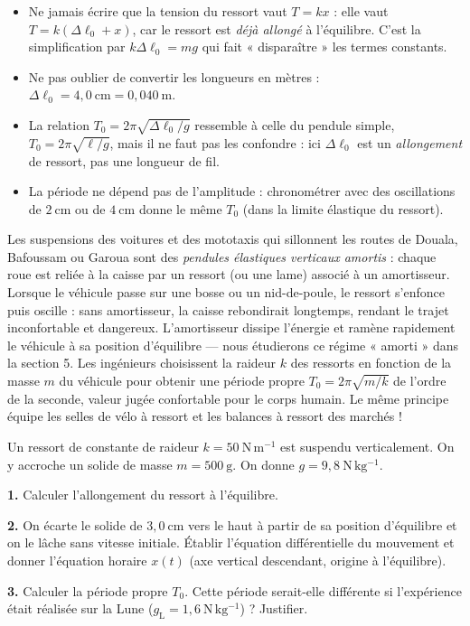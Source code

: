 \documentclass[11pt]{article}
\begin{document}
\begin{attention}
\begin{itemize}
\item Ne jamais écrire que la tension du ressort vaut $T = kx$ : elle vaut $T = k(\Delta\ell_0 + x)$, car le ressort est \emph{déjà allongé} à l'équilibre. C'est la simplification par $k\Delta\ell_0 = mg$ qui fait « disparaître » les termes constants.
\item Ne pas oublier de convertir les longueurs en mètres : $\Delta\ell_0 = 4{,}0~\mathrm{cm} = 0{,}040~\mathrm{m}$.
\item La relation $T_0 = 2\pi\sqrt{\Delta\ell_0/g}$ ressemble à celle du pendule simple, $T_0 = 2\pi\sqrt{\ell/g}$, mais il ne faut pas les confondre : ici $\Delta\ell_0$ est un \emph{allongement} de ressort, pas une longueur de fil.
\item La période ne dépend pas de l'amplitude : chronométrer avec des oscillations de $2~\mathrm{cm}$ ou de $4~\mathrm{cm}$ donne le même $T_0$ (dans la limite élastique du ressort).
\end{itemize}
\end{attention}

\begin{savaistu}
Les suspensions des voitures et des mototaxis qui sillonnent les routes de Douala, Bafoussam ou Garoua sont des \emph{pendules élastiques verticaux amortis} : chaque roue est reliée à la caisse par un ressort (ou une lame) associé à un amortisseur. Lorsque le véhicule passe sur une bosse ou un nid-de-poule, le ressort s'enfonce puis oscille : sans amortisseur, la caisse rebondirait longtemps, rendant le trajet inconfortable et dangereux. L'amortisseur dissipe l'énergie et ramène rapidement le véhicule à sa position d'équilibre — nous étudierons ce régime « amorti » dans la section 5. Les ingénieurs choisissent la raideur $k$ des ressorts en fonction de la masse $m$ du véhicule pour obtenir une période propre $T_0 = 2\pi\sqrt{m/k}$ de l'ordre de la seconde, valeur jugée confortable pour le corps humain. Le même principe équipe les selles de vélo à ressort et les balances à ressort des marchés !
\end{savaistu}

\begin{exercice}
Un ressort de constante de raideur $k = 50~\mathrm{N\,m^{-1}}$ est suspendu verticalement. On y accroche un solide de masse $m = 500~\mathrm{g}$. On donne $g = 9{,}8~\mathrm{N\,kg^{-1}}$.

\textbf{1.} Calculer l'allongement du ressort à l'équilibre.

\textbf{2.} On écarte le solide de $3{,}0~\mathrm{cm}$ vers le haut à partir de sa position d'équilibre et on le lâche sans vitesse initiale. Établir l'équation différentielle du mouvement et donner l'équation horaire $x(t)$ (axe vertical descendant, origine à l'équilibre).

\textbf{3.} Calculer la période propre $T_0$. Cette période serait-elle différente si l'expérience était réalisée sur la Lune ($g_{\text{L}} = 1{,}6~\mathrm{N\,kg^{-1}}$) ? Justifier.
\end{exercice}
\end{document}
